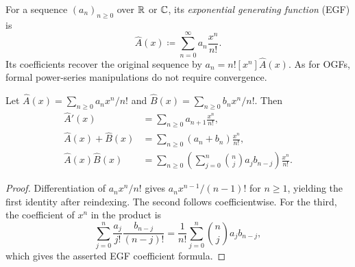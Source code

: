 \documentclass[11pt, oneside]{article}
\begin{document}
\begin{definition}
For a sequence $(a_n)_{n\ge0}$ over $\mathbb{R}$ or $\mathbb{C}$, its \emph{exponential generating function} (EGF) is
\[
\widehat A(x)\coloneqq\sum_{n=0}^{\infty}a_n\frac{x^n}{n!}.
\]
Its coefficients recover the original sequence by $a_n=n![x^n]\widehat A(x)$. As for OGFs, formal power-series manipulations do not require convergence.
\end{definition}
\begin{proposition}\label{prop:egfops}
Let $\widehat A(x)=\displaystyle\sum_{n\ge0}a_nx^n/n!$ and $\widehat B(x)=\displaystyle\sum_{n\ge0}b_nx^n/n!$. Then
\[
\begin{aligned}
\widehat A'(x)&=\sum_{n\ge0}a_{n+1}\frac{x^n}{n!}, \\
\widehat A(x)+\widehat B(x)&=\sum_{n\ge0}(a_n+b_n)\frac{x^n}{n!}, \\
\widehat A(x)\widehat B(x)&=\sum_{n\ge0}
\left(\sum_{j=0}^n\binom nj a_jb_{n-j}\right)\frac{x^n}{n!}.
\end{aligned}
\]
\end{proposition}
\begin{proof}
Differentiation of $a_nx^n/n!$ gives $a_nx^{n-1}/(n-1)!$ for $n\ge1$, yielding the first identity after reindexing. The second follows coefficientwise. For the third, the coefficient of $x^n$ in the product is
\[
\sum_{j=0}^n\frac{a_j}{j!}\frac{b_{n-j}}{(n-j)!}
=\frac1{n!}\sum_{j=0}^n\binom nj a_jb_{n-j},
\]
which gives the asserted EGF coefficient formula.
\end{proof}
\end{document}

